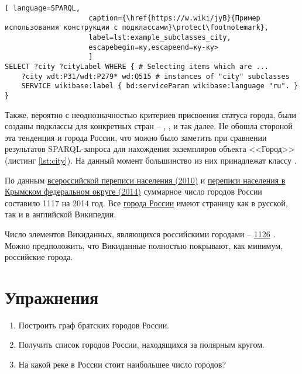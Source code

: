 \begin{lstlisting}[ language=SPARQL, 
                    caption={\href{https://w.wiki/jyB}{Пример использования конструкции с подклассами}\protect\footnotemark},
                    label=lst:example_subclasses_city, 
                    escapebegin=ку,escapeend=ку-ку>
                    ]
SELECT ?city ?cityLabel WHERE { # Selecting items which are ...
	?city wdt:P31/wdt:P279* wd:Q515 # instances of "city" subclasses
	SERVICE wikibase:label { bd:serviceParam wikibase:language "ru". }
}
\end{lstlisting}

Также, вероятно с неоднозначностью критериев присвоения статуса города, были созданы подклассы для конкретных стран -- , ,  и так далее. Не обошла стороной эта тенденция и города России, что можно было заметить при сравнении результатов SPARQL-запроса для нахождения экземпляров объекта <<Город>> (листинг \ref{lst:city}). На данный момент большинство из них принадлежат классу .

По данным \href{http://www.gks.ru/free\_doc/new\_site/perepis2010/croc/Documents/Vol1/pub-01-03.pdf}{всероссийской переписи населения (2010)} и \href{https://rosstat.gov.ru/free\_doc/new\_site/population/demo/perepis\_krim/KRUM\_2015.pdf}{переписи населения в Крымском федеральном округе (2014)} суммарное число городов России составило \num{1117} на 2014 год. Все \href{https://bit.ly/32yqpw5}{города России} имеют страницу как в русской, так и в английской Википедии.

Число элементов Викиданных, являющихся российскими городами -- \href{https://w.wiki/jyP}{1126} . Можно предположить, что Викиданные полностью покрывают, как минимум, российские города. 

\section{Упражнения}
\begin{enumerate}
\item Построить граф братских городов России.
\item Получить список городов России, находящихся за полярным кругом.
\item На какой реке в России стоит наибольшее число городов?
\end{enumerate}